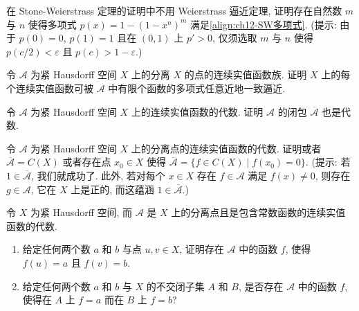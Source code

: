 \documentclass[../../main.tex]{subfiles}
\begin{document}
\begin{exercise}\label{exercise:ch12-32}
在 Stone-Weierstrass 定理的证明中不用 Weierstrass 逼近定理, 证明存在自然数 $m$ 与 $n$ 使得多项式 $p(x)=1-(1-x^{n})^{m}$ 满足\eqref{align:ch12-SW多项式}. (提示: 由于 $p(0)=0$, $p(1)=1$ 且在 $(0,1)$ 上 $p'>0$, 仅须选取 $m$ 与 $n$ 使得 $p(c/2)<\varepsilon$ 且 $p(c)>1-\varepsilon$.)
\end{exercise}

\begin{exercise}\label{exercise:ch12-33}
令 $\mathcal{A}$ 为紧 Hausdorff 空间 $X$ 上的分离 $X$ 的点的连续实值函数族. 证明 $X$ 上的每个连续实值函数可被 $\mathcal{A}$ 中有限个函数的多项式任意近地一致逼近.
\end{exercise}

\begin{exercise}\label{exercise:ch12-34}
令 $\mathcal{A}$ 为紧 Hausdorff 空间 $X$ 上的连续实值函数的代数. 证明 $\mathcal{A}$ 的闭包 $\overline{\mathcal{A}}$ 也是代数.
\end{exercise}

\begin{exercise}\label{exercise:ch12-35}
令 $\mathcal{A}$ 为紧 Hausdorff 空间 $X$ 上的分离点的连续实值函数的代数. 证明或者 $\overline{\mathcal{A}}=C(X)$ 或者存在点 $x_{0}\in X$ 使得 $\overline{\mathcal{A}}=\{f\in C(X)\mid f(x_{0})=0\}$. (提示: 若 $1\in\overline{\mathcal{A}}$, 我们就成功了. 此外, 若对每个 $x\in X$ 存在 $f\in\mathcal{A}$ 满足 $f(x)\neq 0$, 则存在 $g\in\mathcal{A}$, 它在 $X$ 上是正的, 而这蕴涵 $1\in\overline{\mathcal{A}}$.)
\end{exercise}

\begin{exercise}\label{exercise:ch12-36}
令 $X$ 为紧 Hausdorff 空间, 而 $\mathcal{A}$ 是 $X$ 上的分离点且是包含常数函数的连续实值函数的代数.
\begin{enumerate}[(1)]
\item 给定任何两个数 $a$ 和 $b$ 与点 $u,v\in X$, 证明存在 $\mathcal{A}$ 中的函数 $f$, 使得 $f(u)=a$ 且 $f(v)=b$.
\item 给定任何两个数 $a$ 和 $b$ 与 $X$ 的不交闭子集 $A$ 和 $B$, 是否存在 $\mathcal{A}$ 中的函数 $f$, 使得在 $A$ 上 $f=a$ 而在 $B$ 上 $f=b$?
\end{enumerate}
\end{exercise}
\end{document}
